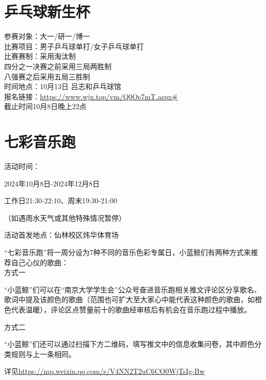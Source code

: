 \documentclass[letterpaper, 12pt]{article}
\begin{document}
\begin{multicols}{2}
\section{乒乓球新生杯}
参赛对象：大一/研一/博一\\
比赛项目：男子乒乓球单打/女子乒乓球单打\\
比赛赛制：采用淘汰制\\
四分之一决赛之前采用三局两胜制\\
八强赛之后采用五局三胜制\\
时间地点：10月13日 吕志和乒乓球馆\\
报名链接：\url{https://www.wjx.top/vm/Q0Oe7mT.aspx#}\\
截止时间10月8日晚上22点


\section{七彩音乐跑}
活动时间：

2024年10月8日-2024年12月8日

工作日21:30-22:10、周末19:30-21:00

（如遇雨水天气或其他特殊情况暂停）



活动首发地点：仙林校区炜华体育场

“七彩音乐跑”将一周分设为7种不同的音乐色彩专属日，小蓝鲸们有两种方式来推荐自己心仪的歌曲：\\



方式一

“小蓝鲸”们可以在“南京大学学生会”公众号奋进音乐跑相关推文评论区分享歌名、歌词中提及该颜色的歌曲（范围也可扩大至大家心中能代表这种颜色的歌曲，如橙色代表温暖），评论区点赞量前十的歌曲经审核后有机会在音乐跑过程中播放。



方式二

“小蓝鲸”们还可以通过扫描下方二维码，填写推文中的信息收集问卷，其中颜色分类规则与上一条相同。



详见\url{https://mp.weixin.qq.com/s/V4NN2T2uC6CO0WjTsIg-Bw}
\end{multicols} 
\end{document}
